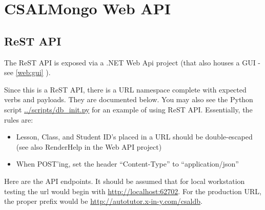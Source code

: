 \documentclass[letterpaper,10pt]{article}
\newcommand{\fullxref}[1]{ \ref{#1} \nameref{#1} }
\begin{document}

\section{CSALMongo Web API}
\label{sec:webapi}

\subsection{ReST API}

The ReST API is exposed via a .NET Web Api project (that also houses a GUI - 
see \fullxref{web:gui}).

Since this is a ReST API, there is a URL namespace complete with expected verbs
and payloads.  They are documented below. You may also see the Python script
\url{../scripts/db_init.py} for an example
of using ReST API.  Essentially, the rules are:

\begin{itemize}
    \item Lesson, Class, and Student ID's placed in a URL should be double-escaped
          (see also RenderHelp in the Web API project)
    \item When POST'ing, set the header ``Content-Type'' to ``application/json''
\end{itemize}

Here are the API endpoints. It should be assumed that for local
workstation testing the url would begin with \url{http://localhost:62702}.  For
the production URL, the proper prefix would be \url{http://autotutor.x-in-y.com/csaldb}.
\end{document}
